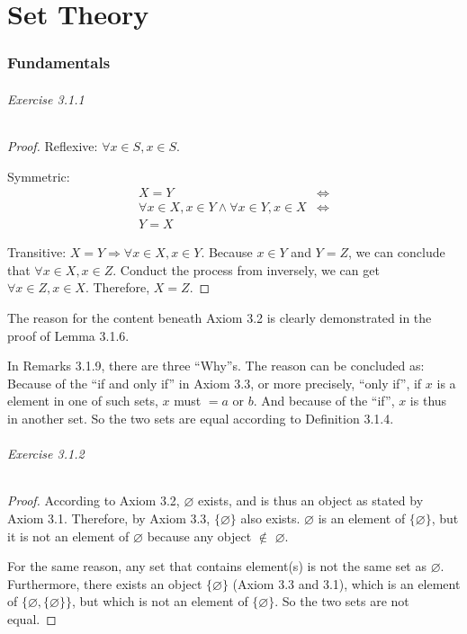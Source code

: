 
\part{Set Theory}

\section{Fundamentals}
\paragraph{Exercise 3.1.1} \label{exercise3.1.1}
\begin{proof}
Reflexive: $\forall x \in S, x \in S$.

Symmetric: 
\begin{align*}
X = Y
&\Longleftrightarrow \\
\forall x \in X, x \in Y \wedge \forall x \in Y, x \in X
&\Longleftrightarrow \\
Y = X
\end{align*}

Transitive:
$X=Y \Longrightarrow \forall x \in X, x \in Y$. Because $x \in Y$ and $Y = Z$, we can conclude that 
$\forall x \in X, x \in Z$. Conduct the process from inversely, we can get $\forall x \in Z, x \in X$. 
Therefore, $X=Z$.
\end{proof}

The reason for the content beneath Axiom 3.2 is clearly demonstrated in the proof of Lemma 3.1.6.

In Remarks 3.1.9, there are three ``Why''s. The reason can be concluded as: Because of the ``if and only 
if'' in Axiom 3.3, or more precisely, ``only if'', if $x$ is a element in one of such sets, $x$ must 
$=a$ or $b$. And because of the ``if'', $x$ is thus in another set. So the two sets are equal according 
to Definition 3.1.4.

\paragraph{Exercise 3.1.2} \label{exercise3.1.2}
\begin{proof}
According to Axiom 3.2, $\varnothing$ exists, and is thus an object as stated by Axiom 3.1. Therefore, 
by Axiom 3.3, $\{\varnothing\}$ also exists. $\varnothing$ is an element of $\{\varnothing\}$, but it 
is not an element of $\varnothing$ because any object $\notin$ $\varnothing$.

For the same reason, any set that contains element(s) is not the same set as $\varnothing$. Furthermore, 
there exists an object $\{\varnothing\}$ (Axiom 3.3 and 3.1), which is an element of 
$\{\varnothing, \{\varnothing\}\}$, but which is not an element of $\{\varnothing\}$. So the two sets 
are not equal.
\end{proof}

